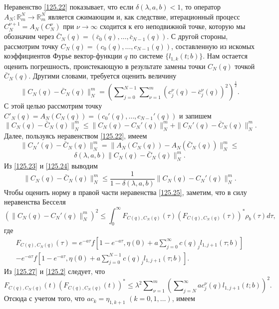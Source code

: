 Неравенство \eqref{125.22} показывает, что если $\delta(\lambda,a,b)<1$, то оператор  $A_N:\mathbb{R}^N_m\to \mathbb{R}^N_m$ является сжимающим и, как следствие, итерационный процесс $C_N^{\nu+1}=A_N(C_N^{\nu})$  при $\nu\to\infty$ сходится к его неподвижной точке, которую мы обозначим через  $\bar C_N(q)=(\bar c_0(q),\ldots,\bar c_{N-1}(q))$. С другой стороны, рассмотрим точку $C_N(q)=(c_0(q),\ldots,c_{N-1}(q))$, составленную из искомых коэффициентов Фурье вектор-функции $q$ по системе $\{l_{1,k}(t;b)\}$. Нам остается оценить погрешность, проистекающую в результате замены точки $C_N(q)$ точкой $\bar C_N(q)$. Другими словами, требуется оценить величину
$$\|C_N(q)-\bar C_N(q)\|_N^m= \left(\sum\nolimits_{j=0}^{N-1}\sum\nolimits_{\nu=1}^m(c_j^\nu(q)-\bar c_j^\nu(q))^2\right)^\frac12.$$
С этой целью рассмотрим точку $C'_N(q)=A_N(C_N(q))=(c_0'(q),\ldots,c_{N-1}'(q))$ и запишем
\begin{equation}\label{125.23}
\|C_N(q)-\bar C_N(q)\|_N^m\le \|C_N(q)- C_N'(q)\|_N^m+\|C_N'(q)-\bar C_N(q)\|_N^m.
\end{equation}
Далее, пользуясь неравенством \eqref{125.22}, имеем
$$
\|C_N'(q)-\bar C_N(q)\|_N^m=\|A_N(C_N(q))-A_N(\bar C_N(q))\|_N^m\le
$$
\begin{equation}\label{125.24}
\delta(\lambda,a,b)\|C_N(q)-\bar C_N(q)\|_N^m.
\end{equation}
Из \eqref{125.23} и \eqref{125.24} выводим
\begin{equation}\label{125.25}
\|C_N(q)-\bar C_N(q)\|_N^m\le \frac1{1-\delta(\lambda,a,b)}\|C_N(q)- C_N'(q)\|_N^m.
\end{equation}
Чтобы оценить норму в правой части неравенства \eqref{125.25}, заметим, что в силу неравенства Бесселя
\begin{equation}\label{125.26}
(\|C_N(q)- C_N'(q)\|_N^m)^2\le \int_{0}^\infty F_{C(q),C_N(q)}(\tau)(F_{C(q),C_N(q)}(\tau))^*\rho_b(\tau) d\tau,
\end{equation}
где
\begin{multline}\label{125.27}
F_{C(q),C_N(q)}(\tau)=e^{-a\tau}f\left[1-e^{-a\tau},\eta(0)+ a\sum\nolimits_{j=0}^\infty c(q)_jl_{1,j+1}(\tau;b)\right] \\
-e^{-a\tau}f\left[1-e^{-a\tau},\eta(0)+ a\sum\nolimits_{j=0}^{N-1} c(q)_jl_{1,j+1}(\tau;b)\right].
\end{multline}
Из \eqref{125.27} и \eqref{125.2} следует, что
$$
F_{C(q),C_N(q)}(t)(F_{C(q),C_N(q)}(t))^*\le \lambda^2 \sum\nolimits_{\nu=1}^m  \left(\sum\nolimits_{j=N}^\infty ac_j^\nu(q)l_{1,j+1}(t;b)\right)^2.
$$
Отсюда с учетом того, что $ac_k= \eta_{1,k+1}$ $(k=0,1,\ldots)$, имеем
